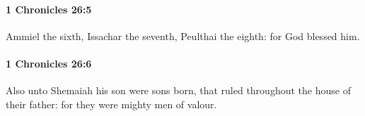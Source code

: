 		\paragraph{1 Chronicles 26:5} %
			\label{1CHRONICLES-26-5}

			Ammiel the sixth, Issachar the seventh, Peulthai the eighth: for God blessed him.


		\paragraph{1 Chronicles 26:6} %
			\label{1CHRONICLES-26-6}

			Also unto Shemaiah his son were sons born, that ruled throughout the house of their father: for they were mighty men of valour.


